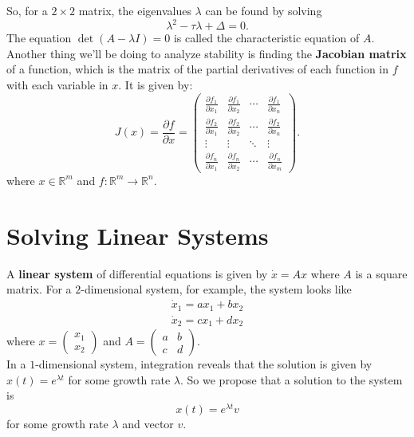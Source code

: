 \documentclass[12pt]{article}
\newcommand{\dx}{\dot{x}}
\begin{document}
So, for a $2\times 2$ matrix, the eigenvalues $\lambda$ can be found by solving
$$\lambda^2 - \tau\lambda + \Delta = 0.$$
The equation $\det(A - \lambda I) = 0$ is called the characteristic equation of $A$. \\

Another thing we'll be doing to analyze stability is finding the \textbf{Jacobian matrix} of a function, which is the matrix of the partial derivatives of each function in $f$ with each variable in $x$. It is given by:
$$J(x) = \frac{\partial f}{\partial x} =
\begin{pmatrix}
\frac{\partial f_1}{\partial x_1} & \frac{\partial f_1}{\partial x_2} & \cdots & \frac{\partial f_1}{\partial x_n} \\
\frac{\partial f_2}{\partial x_1} & \frac{\partial f_2}{\partial x_2} & \cdots & \frac{\partial f_2}{\partial x_n} \\
\vdots & \vdots & \ddots & \vdots \\
\frac{\partial f_n}{\partial x_1} & \frac{\partial f_n}{\partial x_2} & \cdots & \frac{\partial f_n}{\partial x_m}
\end{pmatrix}.$$
where $x \in \mathbb{R}^m$ and $f: \mathbb{R}^m \to \mathbb{R}^n$.

\section{Solving Linear Systems}

A \textbf{linear system} of differential equations is given by $\dx = Ax$ where $A$ is a square matrix. For a $2$-dimensional system, for example, the system looks like
\begin{align*}
\dx_1 = ax_1 + bx_2 \\
\dx_2 = cx_1 + dx_2
\end{align*}
where $x = \begin{pmatrix} x_1 \\ x_2 \end{pmatrix}$ and $A = \begin{pmatrix} a & b \\ c & d \end{pmatrix}$. \\

In a $1$-dimensional system, integration reveals that the solution is given by $x(t) = e^{\lambda t}$ for some growth rate $\lambda$. So we propose that a solution to the system is $$x(t) = e^{\lambda t}v$$ for some growth rate $\lambda$ and vector $v$. \\
\end{document}
